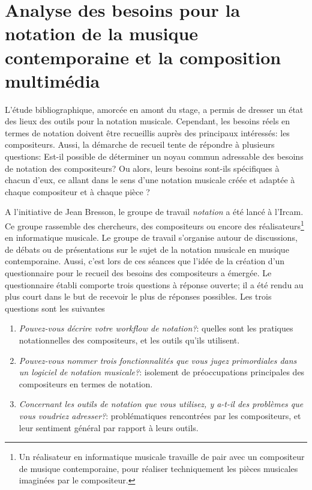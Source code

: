 \section{Analyse des besoins pour la notation de la musique contemporaine et la composition multimédia}
\label{sec:analyseBesoins}

L'étude bibliographique, amorcée en amont du stage, a permis de dresser un état des lieux des outils pour la notation musicale. Cependant, les besoins réels en termes de notation doivent être recueillis auprès des principaux intéressés: les compositeurs. Aussi, la démarche de recueil tente de répondre à plusieurs questions: Est-il possible de déterminer un noyau commun adressable des besoins de notation des compositeurs? Ou alors, leurs besoins sont-ils spécifiques à chacun d'eux, ce allant dans le sens d'une notation musicale créée et adaptée à chaque compositeur et à chaque pièce \cite{bosseur2005}?

A l'initiative de Jean Bresson, le groupe de travail \textit{notation} a été lancé à l'Ircam. Ce groupe rassemble des chercheurs, des compositeurs ou encore des réalisateurs\footnote{Un réalisateur en informatique musicale travaille de pair avec un compositeur de musique contemporaine, pour réaliser techniquement les pièces musicales imaginées par le compositeur.} en informatique musicale. Le groupe de travail s'organise autour de discussions, de débats ou de présentations sur le sujet de la notation musicale en musique contemporaine. Aussi, c'est lors de ces séances que l'idée de la création d'un questionnaire pour le recueil des besoins des compositeurs a émergée.
Le questionnaire établi comporte trois questions à réponse ouverte; il a été rendu au plus court dans le but de recevoir le plus de réponses possibles. Les trois questions sont les suivantes
\begin{enumerate}[label={(\arabic*)}]
	\item \textit{Pouvez-vous décrire votre workflow de notation?}: quelles sont les pratiques notationnelles des compositeurs, et les outils qu'ils utilisent.
	\item \textit{Pouvez-vous nommer trois fonctionnalités que vous jugez primordiales dans un logiciel de notation musicale?}: isolement de préoccupations principales des compositeurs en termes de notation.
	\item \textit{Concernant les outils de notation que vous utilisez, y a-t-il des problèmes que vous voudriez adresser?}: problématiques rencontrées par les compositeurs, et leur sentiment général par rapport à leurs outils.  
\end{enumerate}

